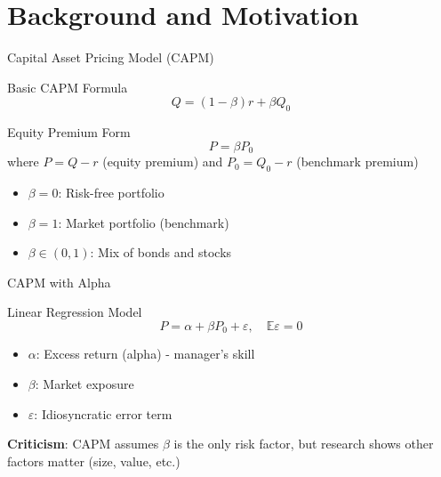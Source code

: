 \documentclass{beamer}
\begin{document}
\section{Background and Motivation}

\begin{frame}{Capital Asset Pricing Model (CAPM)}
\begin{block}{Basic CAPM Formula}
$$Q = (1-\beta)r + \beta Q_0$$
\end{block}

\begin{block}{Equity Premium Form}
$$P = \beta P_0$$
where $P = Q - r$ (equity premium) and $P_0 = Q_0 - r$ (benchmark premium)
\end{block}

\begin{itemize}
    \item $\beta = 0$: Risk-free portfolio
    \item $\beta = 1$: Market portfolio (benchmark)
    \item $\beta \in (0,1)$: Mix of bonds and stocks
\end{itemize}
\end{frame}

\begin{frame}{CAPM with Alpha}
\begin{block}{Linear Regression Model}
$$P = \alpha + \beta P_0 + \varepsilon, \quad \mathbb{E}\varepsilon = 0$$
\end{block}

\begin{itemize}
    \item $\alpha$: Excess return (alpha) - manager's skill
    \item $\beta$: Market exposure
    \item $\varepsilon$: Idiosyncratic error term
\end{itemize}

\vspace{0.3cm}
\textbf{Criticism}: CAPM assumes $\beta$ is the only risk factor, but research shows other factors matter (size, value, etc.)
\end{frame}
\end{document}
